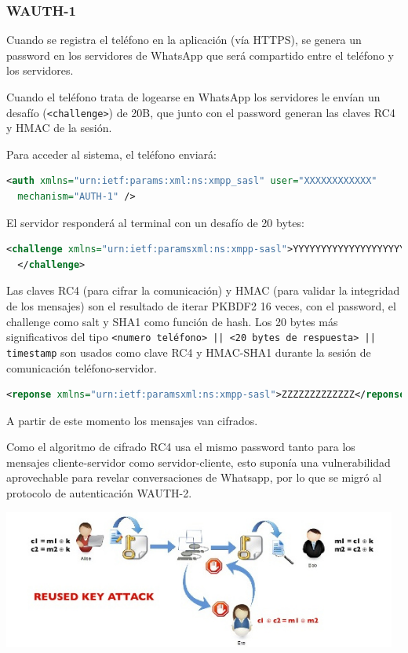 \documentclass[a4paper, 11pt]{article} %
\begin{document}
    \subsubsection{WAUTH-1}
      Cuando se registra el teléfono en la aplicación (vía HTTPS), se genera un password en los servidores
      de WhatsApp que será compartido entre el teléfono y los servidores.

      Cuando el teléfono trata de logearse en WhatsApp los servidores le envían un desafío 
      (\texttt{<challenge>}) de 20B, que junto con el password generan las claves RC4 y HMAC de la sesión. 

      Para acceder al sistema, el teléfono enviará:
      \begin{lstlisting}[language=XML]
  <auth xmlns="urn:ietf:params:xml:ns:xmpp_sasl" user="XXXXXXXXXXXX"
  mechanism="AUTH-1" />
      \end{lstlisting}

      El servidor responderá al terminal con un desafío de 20 bytes:
      \begin{lstlisting}[language=XML]
  <challenge xmlns="urn:ietf:paramsxml:ns:xmpp-sasl">YYYYYYYYYYYYYYYYYYYY
  </challenge>
      \end{lstlisting}

      Las claves RC4 (para cifrar la comunicación) y HMAC (para validar la integridad de los mensajes) son el resultado 
      de iterar PKBDF2 16 veces, con el password, el challenge como salt y SHA1 como función de hash. Los 20 bytes más
      significativos del tipo \texttt{<numero teléfono> || <20 bytes de respuesta> || timestamp} son usados como clave
      RC4 y HMAC-SHA1 durante la sesión de comunicación teléfono-servidor.

      \begin{lstlisting}[language=XML]
  <reponse xmlns="urn:ietf:paramsxml:ns:xmpp-sasl">ZZZZZZZZZZZZZ</reponse>
      \end{lstlisting}

      A partir de este momento los mensajes van cifrados.

      Como el algoritmo de cifrado RC4 usa el mismo password tanto para los mensajes cliente-servidor como servidor-cliente,
      esto suponía una vulnerabilidad aprovechable para revelar conversaciones de Whatsapp, por lo que se migró al protocolo
      de autenticación WAUTH-2.
      
      \begin{center}
	\includegraphics[width=13cm]{wauth-1.jpg}
      \end{center}
      
\end{document}
